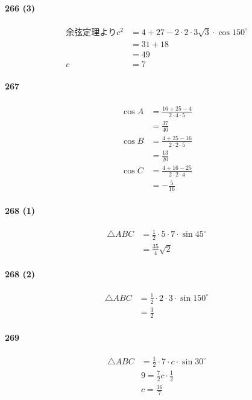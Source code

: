 \documentclass[fleqn,a4j,dvipdfmx,uplatex,twocolumn]{jsarticle}
\begin{document}
\paragraph{266 (3)}
\begin{align*}
余弦定理より
c^2 & =4+27-2 \cdot 2 \cdot 3 \sqrt{3} \cdot \cos 150^{\circ} \\
& =31+18 \\
& =49 \\
c & =7
\end{align*}

\paragraph{267}
\begin{align*}
\cos A & =\frac{16+25-4}{2 \cdot 4 \cdot 5} \\
& =\frac{37}{40} \\
\cos B & =\frac{4+25-16}{2 \cdot 2 \cdot 5} \\
& =\frac{13}{20} \\
\cos C & =\frac{4+16-25}{2 \cdot 2 \cdot 4} \\
& =-\frac{5}{16}
\end{align*}

\paragraph{268 (1)}
\begin{align*}
\triangle A B C & =\frac{1}{2} \cdot 5 \cdot 7 \cdot \sin 45^{\circ} \\
& =\frac{35}{4} \sqrt{2}
\end{align*}

\paragraph{268 (2)}
\begin{align*}
\triangle A B C & =\frac{1}{2} \cdot 2 \cdot 3 \cdot \sin 150^{\circ} \\
& =\frac{3}{2}
\end{align*}

\paragraph{269}
\begin{align*}
\triangle A B C & =\frac{1}{2} \cdot 7 \cdot c \cdot \sin 30^{\circ} \\
& 9 =\frac{7}{2}c \cdot \frac{1}{2} \\
& c = \frac{36}{7}
\end{align*}
\end{document}
